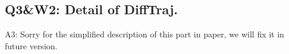 \documentclass{article}
\begin{document}
\subsection{Q3\&W2: Detail of DiffTraj.}\label{q3w2-detail-of-difftraj.}

A3: Sorry for the simplified description of this part in paper, we will fix it in future version.







\end{document}
